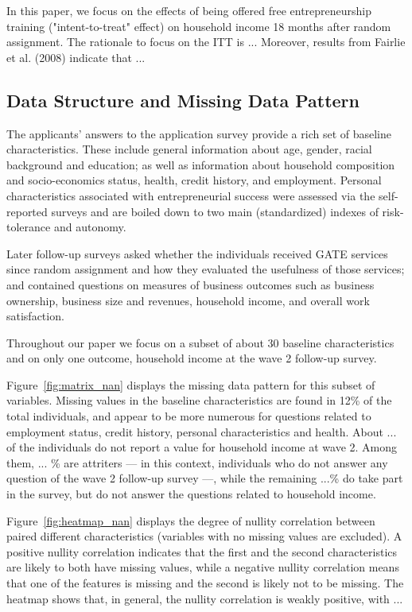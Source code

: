In this paper, we focus on the effects of being offered free entrepreneurship training ("intent-to-treat" effect) on household income 18 months after random assignment. %
The rationale to focus on the ITT is ... %
Moreover, results from Fairlie et al. (2008) indicate that ... %

\subsection{Data Structure and Missing Data Pattern}

The applicants' answers to the application survey provide a rich set of baseline characteristics. These include general information about age, gender, racial background and education; as well as information about household composition and socio-economics status, health, credit history, and employment. Personal characteristics associated with entrepreneurial success were assessed via the self-reported surveys and are boiled down to two main (standardized) indexes of risk-tolerance and autonomy.

Later follow-up surveys asked whether the individuals received GATE services since random assignment and how they evaluated the usefulness of those services; and contained questions on measures of business outcomes such as business ownership, business size and revenues, household income, and overall work satisfaction.

Throughout our paper we focus on a subset of about 30 baseline characteristics and on only one outcome, household income at the wave 2 follow-up survey.

Figure~\ref{fig:matrix_nan} displays the missing data pattern for this subset of variables. Missing values in the baseline characteristics are found in 12\% of the total individuals, and appear to be more numerous for questions related to employment status, credit history, personal characteristics and health. About ... of the individuals do not report a value for household income at wave 2. Among them, ... \% are attriters --- in this context, individuals who do not answer any question of the wave 2 follow-up survey ---, while the remaining ...\% do take part in the survey, but do not answer the questions related to household income.

Figure~\ref{fig:heatmap_nan} displays the degree of nullity correlation between paired different characteristics (variables
with no missing values are excluded). A positive nullity correlation indicates that the first and the second characteristics are likely to both have missing values, while a negative nullity correlation means that one of the features is missing and the second is likely not to be missing. The heatmap shows that, in general, the nullity correlation is weakly positive, with ...




